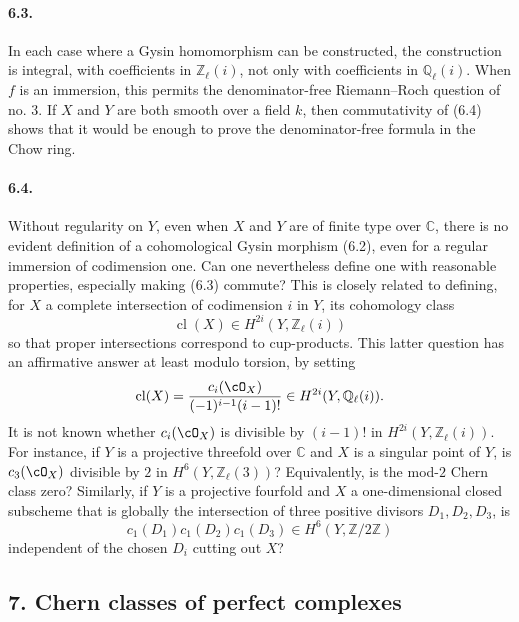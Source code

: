 \documentclass[11pt]{article}
\theoremstyle{plain}
\theoremstyle{definition}
\theoremstyle{remark}
\newcommand{\CC}{\mathbb C}
\newcommand{\QQ}{\mathbb Q}
\newcommand{\ZZ}{\mathbb Z}
\DeclareMathOperator{\cl}{cl}
\begin{document}
\paragraph{6.3.}
In each case where a Gysin homomorphism can be constructed, the construction is integral, with coefficients in $\ZZ_\ell(i)$, not only with coefficients in $\QQ_\ell(i)$. When $f$ is an immersion, this permits the denominator-free Riemann--Roch question of no. 3. If $X$ and $Y$ are both smooth over a field $k$, then commutativity of (6.4) shows that it would be enough to prove the denominator-free formula in the Chow ring.

\paragraph{6.4.}
Without regularity on $Y$, even when $X$ and $Y$ are of finite type over $\CC$, there is no evident definition of a cohomological Gysin morphism (6.2), even for a regular immersion of codimension one. Can one nevertheless define one with reasonable properties, especially making (6.3) commute? This is closely related to defining, for $X$ a complete intersection of codimension $i$ in $Y$, its cohomology class
\[
\cl(X)\in H^{2i}(Y,\ZZ_\ell(i))
\]
so that proper intersections correspond to cup-products. This latter question has an affirmative answer at least modulo torsion, by setting
\[
\cl(X)=\frac{c_i(\cO_X)}{(-1)^{i-1}(i-1)!}\in H^{2i}(Y,\QQ_\ell(i)).
\]
It is not known whether $c_i(\cO_X)$ is divisible by $(i-1)!$ in $H^{2i}(Y,\ZZ_\ell(i))$. For instance, if $Y$ is a projective threefold over $\CC$ and $X$ is a singular point of $Y$, is $c_3(\cO_X)$ divisible by $2$ in $H^6(Y,\ZZ_\ell(3))$? Equivalently, is the mod-$2$ Chern class zero? Similarly, if $Y$ is a projective fourfold and $X$ a one-dimensional closed subscheme that is globally the intersection of three positive divisors $D_1,D_2,D_3$, is
\[
c_1(D_1)c_1(D_2)c_1(D_3)\in H^6(Y,\ZZ/2\ZZ)
\]
independent of the chosen $D_i$ cutting out $X$?

\subsection*{7. Chern classes of perfect complexes}
\end{document}
